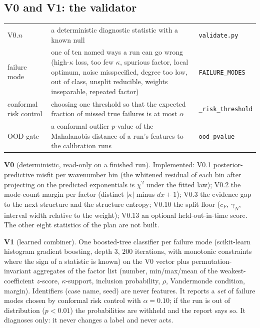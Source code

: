 \subsection{V0 and V1: the validator}\label{sec:valid}
\begin{symbols}
\begin{tabular}{@{}L{2.6cm}L{6.0cm}L{4.3cm}@{}}
V0.$n$ & a deterministic diagnostic statistic with a known null & \texttt{validate.py}\\
failure mode & one of ten named ways a run can go wrong (high-$\kappa$ loss, too few $\kappa$, spurious factor, local optimum, noise misspecified, degree too low, out of class, unsplit reducible, weights inseparable, repeated factor) & \texttt{FAILURE\_MODES}\\
conformal risk control & choosing one threshold so that the expected fraction of missed true failures is at most $\alpha$ & \texttt{\_risk\_threshold}\\
OOD gate & a conformal outlier $p$-value of the Mahalanobis distance of a run's features to the calibration runs & \texttt{ood\_pvalue}\\
\end{tabular}
\end{symbols}
\textbf{V0} (deterministic, read-only on a finished run). Implemented: V0.1 posterior-predictive misfit per wavenumber bin (the whitened residual of each bin after projecting on the predicted exponentials is $\chi^2$ under the fitted law); V0.2 the mode-count margin per factor (distinct $|\kappa|$ minus $dx+1$); V0.3 the evidence gap to the next structure and the structure entropy; V0.10 the split floor ($c_F$, $\gamma_N$, interval width relative to the weight); V0.13 an optional held-out-in-time score. The other eight statistics of the plan are not built.

\textbf{V1} (learned combiner). One boosted-tree classifier per failure mode (scikit-learn histogram gradient boosting, depth $3$, $200$ iterations, with monotonic constraints where the sign of a statistic is known) on the V0 vector plus permutation-invariant aggregates of the factor list (number, min/max/mean of the weakest-coefficient $z$-score, $\kappa$-support, inclusion probability, $\rho$, Vandermonde condition, margin). Identifiers (case name, seed) are never features. It reports a \emph{set} of failure modes chosen by conformal risk control with $\alpha=0.10$; if the run is out of distribution ($p<0.01$) the probabilities are withheld and the report says so. It diagnoses only: it never changes a label and never acts.

